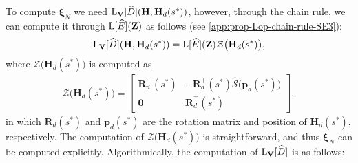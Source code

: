 To compute $\boldsymbol{\xi}_N$ we need $\operatorname{L}_\mathbf{V}[\widehat{D}](\mathbf{H}, \mathbf{H}_d(s^*))$, however, through the chain rule, we can compute it through $\operatorname{L}[\widehat{E}](\mathbf{Z})$ as follows (see \cref{app:prop-Lop-chain-rule-SE3}):
\begin{align}
    \operatorname{L}_\mathbf{V}[\widehat{D}](\mathbf{H}, \mathbf{H}_d(s^*)) = \operatorname{L}[\widehat{E}](\mathbf{Z})\mathcal{Z}\bigl(\mathbf{H}_d(s^*)\bigr),
\end{align}
where $\mathcal{Z}\bigl(\mathbf{H}_d(s^*)\bigr)$ is computed as
\begin{align}
    \mathcal{Z}\bigl(\mathbf{H}_d(s^*)\bigr) = \begin{bmatrix}
        \mathbf{R}_d^\top(s^*) & -\mathbf{R}_d^\top(s^*)\widehat{\mathcal{S}}\bigl(\mathbf{p}_d(s^*)\bigr)\\
        \mathbf{0} & \mathbf{R}_d^\top(s^*)
    \end{bmatrix}, \label{eq:explicit-EE-dista-SE3-component-Zmap}
\end{align}
in which $\mathbf{R}_d(s^*)$ and $\mathbf{p}_d(s^*)$ are the rotation matrix and position of $\mathbf{H}_d(s^*)$, respectively. The computation of $\mathcal{Z}\bigl(\mathbf{H}_d(s^*)\bigr)$ is straightforward, and thus $\boldsymbol{\xi}_N$ can be computed explicitly. Algorithmically, the computation of $\operatorname{L}_\mathbf{V}[\widehat{D}]$ is as follows:
